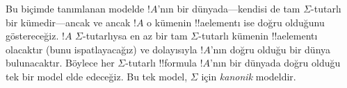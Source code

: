 Bu biçimde tanımlanan modelde $!A$'nın bir dünyada---kendisi de tam
$\Sigma$-tutarlı bir kümedir---ancak ve ancak $!A$ o kümenin !!a{element}{}ı
ise doğru olduğunu göstereceğiz. $!A$ $\Sigma$-tutarlıysa en az bir tam
$\Sigma$-tutarlı kümenin !!a{element}{}ı olacaktır (bunu ispatlayacağız) ve
dolayısıyla $!A$'nın doğru olduğu bir dünya bulunacaktır. Böylece her
$\Sigma$-tutarlı !!{formula} $!A$'nın bir dünyada doğru olduğu tek bir
model elde edeceğiz. Bu tek model, $\Sigma$ için \emph{kanonik} modeldir.

